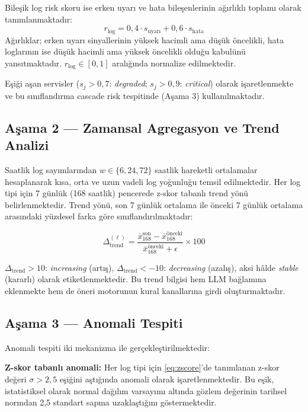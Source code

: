 Bileşik log risk skoru ise erken uyarı ve hata bileşenlerinin ağırlıklı toplamı olarak tanımlanmaktadır:
\begin{equation}
    r_{\text{log}} = 0{,}4 \cdot s_{\text{uyarı}} + 0{,}6 \cdot s_{\text{hata}}
    \label{eq:log-risk}
\end{equation}
Ağırlıklar; erken uyarı sinyallerinin yüksek hacimli ama düşük öncelikli, hata loglarının ise düşük hacimli ama yüksek öncelikli olduğu kabulünü yansıtmaktadır.
$r_{\text{log}} \in [0, 1]$ aralığında normalize edilmektedir.

Eşiği aşan servisler ($s_j > 0{,}7$: \textit{degraded}; $s_j > 0{,}9$: \textit{critical}) olarak işaretlenmekte ve bu sınıflandırma cascade risk tespitinde (Aşama 3) kullanılmaktadır.

\subsection{Aşama 2 — Zamansal Agregasyon ve Trend Analizi}

Saatlik log sayımlarından $w \in \{6, 24, 72\}$ saatlik hareketli ortalamalar hesaplanarak kısa, orta ve uzun vadeli log yoğunluğu temsil edilmektedir.
Her log tipi için 7 günlük (168 saatlik) pencerede z-skor tabanlı trend yönü belirlenmektedir.
Trend yönü, son 7 günlük ortalama ile önceki 7 günlük ortalama arasındaki yüzdesel farka göre sınıflandırılmaktadır:

\begin{equation}
    \Delta_{\text{trend}}^{(\ell)} = \frac{\bar{x}_{168}^{\text{son}} - \bar{x}_{168}^{\text{önceki}}}{\bar{x}_{168}^{\text{önceki}} + \epsilon} \times 100
    \label{eq:trend}
\end{equation}

$\Delta_{\text{trend}} > 10$: \textit{increasing} (artış), $\Delta_{\text{trend}} < -10$: \textit{decreasing} (azalış), aksi hâlde \textit{stable} (kararlı) olarak etiketlenmektedir.
Bu trend bilgisi hem LLM bağlamına eklenmekte hem de öneri motorunun kural kanallarına girdi oluşturmaktadır.

\subsection{Aşama 3 — Anomali Tespiti}

Anomali tespiti iki mekanizma ile gerçekleştirilmektedir:

\textbf{Z-skor tabanlı anomali:} Her log tipi için \autoref{eq:zscore}'de tanımlanan z-skor değeri $\sigma > 2{,}5$ eşiğini aştığında anomali olarak işaretlenmektedir.
Bu eşik, istatistiksel olarak normal dağılım varsayımı altında gözlem değerinin tarihsel normdan 2{,}5 standart sapma uzaklaştığını göstermektedir.


